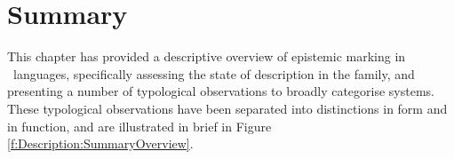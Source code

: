 
\section{Summary}
This chapter has provided a descriptive overview of epistemic marking in \lfam\ languages, specifically assessing the state of description in the family, and presenting a number of typological observations to broadly categorise systems. These typological observations have been separated into distinctions in form and in function, and are illustrated in brief in Figure \ref{f:Description:SummaryOverview}.

